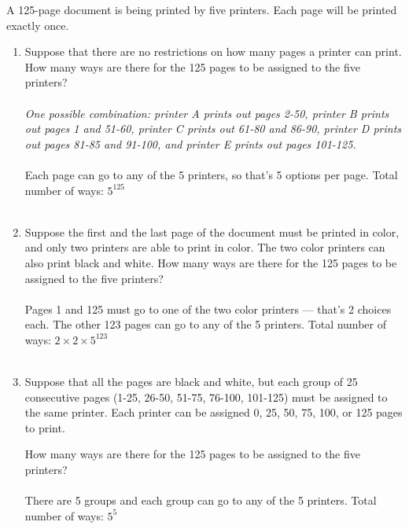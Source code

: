 \documentclass{amsart}
\theoremstyle{definition}
\theoremstyle{Exercise}
\theoremstyle{remark}
\theoremstyle{rule}
\numberwithin{equation}{section}
\begin{document}
A 125-page document is being printed by five printers. Each page will be printed exactly once.
 \begin{enumerate}[label=(\alph*)]
 \item  Suppose that there are no restrictions on how many pages a printer can print. How many ways are there for the 125 pages to be assigned to the five printers?\\\\
{\it One possible combination: printer A prints out pages 2-50, printer B prints out pages 1 and 51-60, printer C prints out 61-80 and 86-90, printer D prints out pages 81-85 and 91-100, and printer E prints out pages 101-125.}\\\\
Each page can go to any of the 5 printers, so that's 5 options per page.
Total number of ways: $5^{125}$
        \\\\
 \item Suppose the first and the last page of the document must be printed in color, and only two printers are able to print in color. The two color printers can also print black and white. How many ways are there for the 125 pages to be assigned to the five printers?\\\\
Pages 1 and 125 must go to one of the two color printers — that’s 2 choices each. The other 123 pages can go to any of the 5 printers.
Total number of ways: $2 \times 2 \times 5^{123}$
        \\\\
 \item Suppose that all the pages are black and white, but each group of 25 consecutive pages (1-25, 26-50, 51-75, 76-100, 101-125) must be assigned to the same printer. Each printer can be assigned 0, 25, 50, 75, 100, or 125 pages to print.

How many ways are there for the 125 pages to be assigned to the five printers?\\\\
There are 5 groups and each group can go to any of the 5 printers.
Total number of ways: $5^5$
        \\\\
   \end{enumerate}
 \newpage
\end{document}
